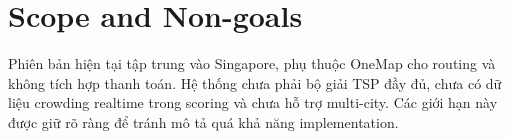 \section{Scope and Non-goals}

Phiên bản hiện tại tập trung vào Singapore, phụ thuộc OneMap cho routing và không tích hợp thanh toán. Hệ thống chưa phải bộ giải TSP đầy đủ, chưa có dữ liệu crowding realtime trong scoring và chưa hỗ trợ multi-city. Các giới hạn này được giữ rõ ràng để tránh mô tả quá khả năng implementation.
